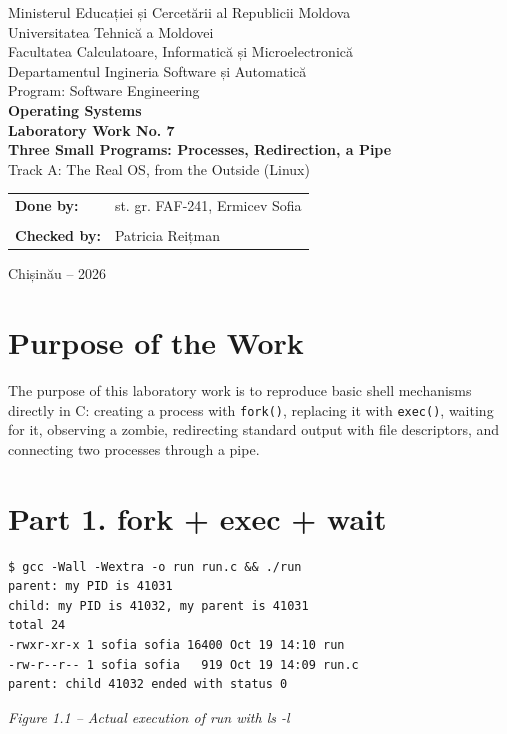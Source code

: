 \documentclass[12pt,a4paper]{article}
\newcommand{\figcap}[1]{\begin{center}\small\textit{#1}\end{center}\vspace{0.4em}}
\begin{document}
\begin{titlepage}
\begin{center}
{\large Ministerul Educației și Cercetării al Republicii Moldova}\\[0.3cm]
{\large Universitatea Tehnică a Moldovei}\\[0.3cm]
{\large Facultatea Calculatoare, Informatică și Microelectronică}\\[0.3cm]
{\large Departamentul Ingineria Software și Automatică}\\[0.3cm]
{\large Program: Software Engineering}\\[2.0cm]
{\Large \textbf{Operating Systems}}\\[0.8cm]
{\LARGE \textbf{Laboratory Work No. 7}}\\[0.5cm]
{\Large \textbf{Three Small Programs: Processes, Redirection, a Pipe}}\\[0.35cm]
{\large Track A: The Real OS, from the Outside (Linux)}
\vfill
\begin{flushright}
\begin{tabular}{ll}
\textbf{Done by:} & st. gr. FAF-241, Ermicev Sofia \\
\\
\textbf{Checked by:} & Patricia Reițman
\end{tabular}
\end{flushright}
\vfill
{\large Chișinău -- 2026}
\end{center}
\end{titlepage}
\tableofcontents
\newpage

\section{Purpose of the Work}
The purpose of this laboratory work is to reproduce basic shell mechanisms directly in C: creating a process with \texttt{fork()}, replacing it with \texttt{exec()}, waiting for it, observing a zombie, redirecting standard output with file descriptors, and connecting two processes through a pipe.

\section{Part 1. fork + exec + wait}
\begin{lstlisting}
$ gcc -Wall -Wextra -o run run.c && ./run
parent: my PID is 41031
child: my PID is 41032, my parent is 41031
total 24
-rwxr-xr-x 1 sofia sofia 16400 Oct 19 14:10 run
-rw-r--r-- 1 sofia sofia   919 Oct 19 14:09 run.c
parent: child 41032 ended with status 0
\end{lstlisting}
\figcap{Figure 1.1 -- Actual execution of run with ls -l}
\end{document}
